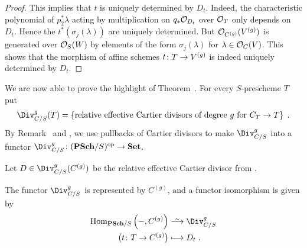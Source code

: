 \documentclass[a4paper,parskip=half,numbers=enddot, DIV=12]{scrreprt}
\begin{document}
\begin{proof}
	 This implies that $t$ is uniquely determined by $D_t$. Indeed, the characteristic polynomial of $p_2^*\lambda$ acting by multiplication on $q_*\mathcal{O}_{D_t}$ over $\mathcal{O}_T$ only depends on $D_t$. Hence the $t^*(\sigma_j(\lambda))$ are uniquely determined. But $\mathcal{O}_{C^{(g)}}(V^{(g)})$ is generated over $\mathcal{O}_S(W)$ by elements of the form $\sigma_j(\lambda)$ for $\lambda\in\mathcal{O}_C(V)$. This shows that the morphism of affine schemes $t\colon T\morphism V^{(g)}$ is indeed uniquely determined by $D_t$.
\end{proof}
We are now able to prove the highlight of Theorem~. For every $S$-prescheme $T$ put 
\begin{align*}
	\Div_{C/S}^g(T)=\left\{\text{relative effective Cartier divisors of degree $g$ for }C_T\to T\right\}\;.
\end{align*}
By Remark~ and , we use pullbacks of Cartier divisors to make $\Div_{C/S}^g$ into a functor $\Div_{C/S}^g\colon (\cat{PSch}/S)^\op\morphism\cat{Set}$.
\setcounter{thm}{11}
\begin{thm}[end]
	Let $D\in \Div_{C/S}^g(C^{(g)})$ be the relative effective Cartier divisor from .
	\begin{alphanumerate}\setcounter{enumi}{5}
		\item The functor $\Div_{C/S}^g$ is represented by $C^{(g)}$, and a functor isomorphism is given by
		\begin{align*}
			\Hom_{\cat{PSch}/S}\left(-,C^{(g)}\right)&\isomorphism\Div_{C/S}^g\\
			\big(t\colon T\to C^{(g)}\big)&\longmapsto D_t\;.
		\end{align*}
	\end{alphanumerate}
\end{thm}
\end{document}
